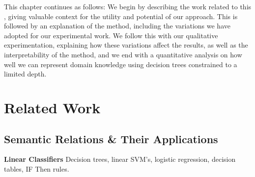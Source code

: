 









This chapter continues as follows: We begin by describing the work related to this , giving valuable context for the utility and potential of our approach. This is followed by an explanation of the method, including the variations we have adopted for our experimental work. We follow this with our qualitative experimentation, explaining how these variations affect the results, as well as the interpretability of the method, and we end with a quantitative analysis on how well we can represent domain knowledge using decision trees constrained to a limited depth.



\section{Related Work}
\subsection{Semantic Relations \& Their Applications}
\textbf{Linear Classifiers}
Decision trees, linear SVM's, logistic regression, decision tables, IF Then rules.

